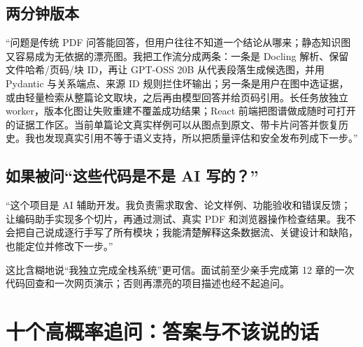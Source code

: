 \documentclass[UTF8,11pt,a4paper,fontset=fandol]{ctexart}
\begin{document}
\subsection*{两分钟版本}
“问题是传统 PDF 问答能回答，但用户往往不知道一个结论从哪来；静态知识图又容易成为无依据的漂亮图。我把工作流分成两条：一条是 Docling 解析、保留文件哈希/页码/块 ID，再让 GPT-OSS 20B 从代表段落生成候选图，并用 Pydantic 与关系端点、来源 ID 规则拦住坏输出；另一条是用户在图中选证据，或由轻量检索从整篇论文取块，之后再由模型回答并给页码引用。长任务放独立 worker，版本化图让失败重建不覆盖成功结果；React 前端把图谱做成随时可打开的证据工作区。当前单篇论文真实样例可以从图点到原文、带卡片问答并恢复历史。我也发现真实引用不等于语义支持，所以把质量评估和安全发布列成下一步。”

\subsection*{如果被问“这些代码是不是 AI 写的？”}
“这个项目是 AI 辅助开发。我负责需求取舍、论文样例、功能验收和错误反馈；让编码助手实现多个切片，再通过测试、真实 PDF 和浏览器操作检查结果。我不会把自己说成逐行手写了所有模块；我能清楚解释这条数据流、关键设计和缺陷，也能定位并修改下一步。”

这比含糊地说“我独立完成全栈系统”更可信。面试前至少亲手完成第 12 章的一次代码回查和一次网页演示；否则再漂亮的项目描述也经不起追问。

\section{十个高概率追问：答案与不该说的话}
\end{document}
